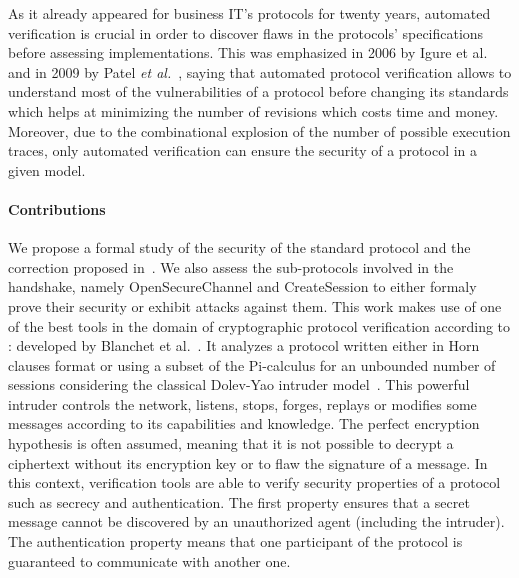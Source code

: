 As it already appeared for business IT's protocols for twenty years, automated
verification is crucial in order to discover flaws in the protocols'
specifications before assessing implementations.  This was emphasized
in 2006 by Igure et al.~\cite{ILW06} and in 2009 by Patel \emph{et
al.}~\cite{PBG09}, saying that automated protocol verification allows
to understand most of the vulnerabilities of a protocol before
changing its standards which helps at minimizing the number of
revisions which costs time and money.  Moreover, due to the
combinational explosion of the number of possible execution traces,
only automated verification can ensure the security of a protocol in a
given model.


\paragraph{Contributions}

We propose a formal study of the security of the standard \modbus protocol and
the correction proposed in~\cite{FCMT09}.%
We also assess the sub-protocols involved in the \opcua handshake, namely \opcua
OpenSecureChannel and \opcua CreateSession to either formaly prove their
security or exhibit attacks against them.
This work makes use of one of the best tools in the domain of cryptographic
protocol verification according to \cite{LP15}: \proverif developed by Blanchet
et al.~\cite{Bla01}.
It analyzes a protocol written either in Horn clauses format or using a subset
of the Pi-calculus for an unbounded number of sessions considering the
classical Dolev-Yao intruder model~\cite{DY81}.
This powerful intruder controls the network, listens, stops, forges, replays or
modifies some messages according to its capabilities and knowledge.
The perfect encryption hypothesis is often assumed, meaning that it is not
possible to decrypt a ciphertext without its encryption key or to flaw
the signature of a message.
In this context, verification tools are able to verify security properties
of a protocol such as secrecy and authentication.
The first property ensures that a secret message cannot be discovered by an
unauthorized agent (including the intruder).
The authentication property means that one participant of the protocol is
guaranteed to communicate with another one.


